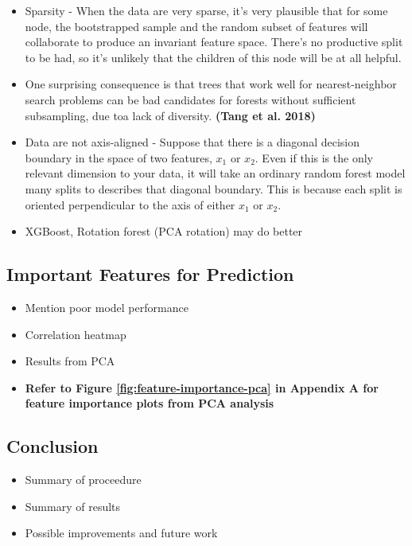 \documentclass[12pt,]{article}
\providecommand{\tightlist}{%
  \setlength{\itemsep}{0pt}\setlength{\parskip}{0pt}}
\begin{document}
\begin{itemize}
\item
  Sparsity - When the data are very sparse, it's very plausible that for
  some node, the bootstrapped sample and the random subset of features
  will collaborate to produce an invariant feature space. There's no
  productive split to be had, so it's unlikely that the children of this
  node will be at all helpful.
\item
  One surprising consequence is that trees that work well for
  nearest-neighbor search problems can be bad candidates for forests
  without sufficient subsampling, due toa lack of diversity.
  \textbf{(Tang et al. 2018)}
\item
  Data are not axis-aligned - Suppose that there is a diagonal decision
  boundary in the space of two features, \(x_1\) or \(x_2\). Even if
  this is the only relevant dimension to your data, it will take an
  ordinary random forest model many splits to describes that diagonal
  boundary. This is because each split is oriented perpendicular to the
  axis of either \(x_1\) or \(x_2\).
\item
  XGBoost, Rotation forest (PCA rotation) may do better
\end{itemize}

\subsection{Important Features for
Prediction}\label{important-features-for-prediction}

\begin{itemize}
\tightlist
\item
  Mention poor model performance
\item
  Correlation heatmap
\item
  Results from PCA
\item
  \textbf{Refer to Figure \ref{fig:feature-importance-pca} in Appendix A
  for feature importance plots from PCA analysis}
\end{itemize}

\subsection{Conclusion}\label{conclusion}

\begin{itemize}
\tightlist
\item
  Summary of proceedure
\item
  Summary of results
\item
  Possible improvements and future work
\end{itemize}
\end{document}

